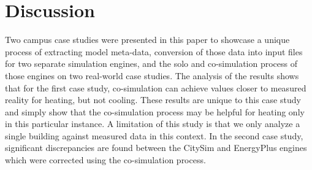 \documentclass{tBPS2e}
\theoremstyle{plain}
\theoremstyle{definition}
\theoremstyle{remark}
\newcommand{\noteCM}[1]{\footnote{\textcolor{red}{#1}}}
\begin{document}







\section{Discussion}
Two campus case studies were presented in this paper to showcase a unique process of extracting model meta-data, conversion of those data into input files for two separate simulation engines, and the solo
and co-simulation process of those engines on two real-world case studies. The analysis of the results shows that for the first case study, co-simulation can achieve values closer to measured reality for heating, but not cooling. 
These results are unique to this case study and simply show that the co-simulation process may be helpful for heating only
in this particular instance. A limitation of this study is that we only analyze a single building against measured data in this
context. In the second case study, significant discrepancies are found between the CitySim and EnergyPlus engines which were corrected using the co-simulation process.
\end{document}
